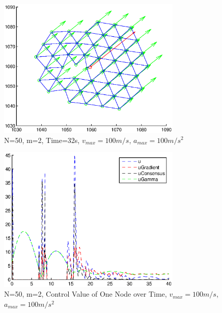 \documentclass[10pt, conference]{IEEEtran}
\begin{document}
\begin{figure}[!p]
  \begin{center}
    \includegraphics[width=3.45in]{n50m2vmax100amax100t32}
  \end{center}

  \caption{\small N=50, m=2, Time=32s, $v_{max}=100m/s$, $a_{max}=100m/s^2$}
  \label{fig:n50m2vmax100amax100t32}
\end{figure}

\begin{figure}[!p]
  \begin{center}
    \includegraphics[width=3.45in]{n50m2vmax100amax100control}
  \end{center}

  \caption{\small N=50, m=2, Control Value of One Node over Time, $v_{max}=100m/s$, $a_{max}=100m/s^2$}
  \label{fig:n50m2vmax100amax100control}
\end{figure}
\end{document}
